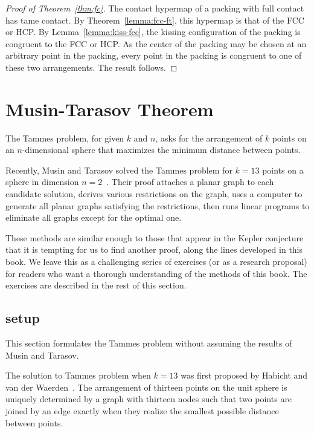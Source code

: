 \begin{proof}[Proof of Theorem~\ref{thm:fc}]  %
  The contact hypermap of a packing with full contact has tame
  contact.  By Theorem~\ref{lemma:fcc-ft}, this hypermap is that of
  the FCC or HCP.  By Lemma~\ref{lemma:kiss-fcc}, the kissing
  configuration of the packing is congruent to the FCC or HCP.  As the
  center of the packing may be chosen at an arbitrary point in the
  packing, every point in the packing is congruent to one of these two
  arrangements.  The result follows.
\end{proof}



\section{Musin-Tarasov Theorem}

The Tammes problem, for given $k$ and $n$, asks for the arrangement of
$k$ points on an $n$-dimensional sphere that maximizes the minimum
distance between points.

Recently, Musin and Tarasov solved the Tammes problem for $k=13$
points on a sphere in dimension $n=2$~\cite{Musin-Tarasov}.  Their
proof attaches a planar graph to each candidate solution, derives
various restrictions on the graph, uses a computer to generate all
planar graphs satisfying the restrictions, then runs linear programs
to eliminate all graphs except for the optimal one.

These methods are similar enough to those that appear in the Kepler
conjecture that it is tempting for us to find another proof, along the
lines developed in this book.  We leave this as a challenging series
of exercises (or as a research proposal) for readers who want a
thorough understanding of the methods of this book.  The exercises are
described in the rest of this section.

\subsection{setup}

This section formulates the Tammes problem without assuming the results
of Musin and Tarasov.

The solution to Tammes problem when $k=13$ was first proposed by
Habicht and van der Waerden~\cite{unknown}.  The arrangement of thirteen
points on the unit sphere is uniquely determined by a graph with thirteen
nodes such that two points are joined by an edge exactly when they
realize the smallest possible distance between points.

